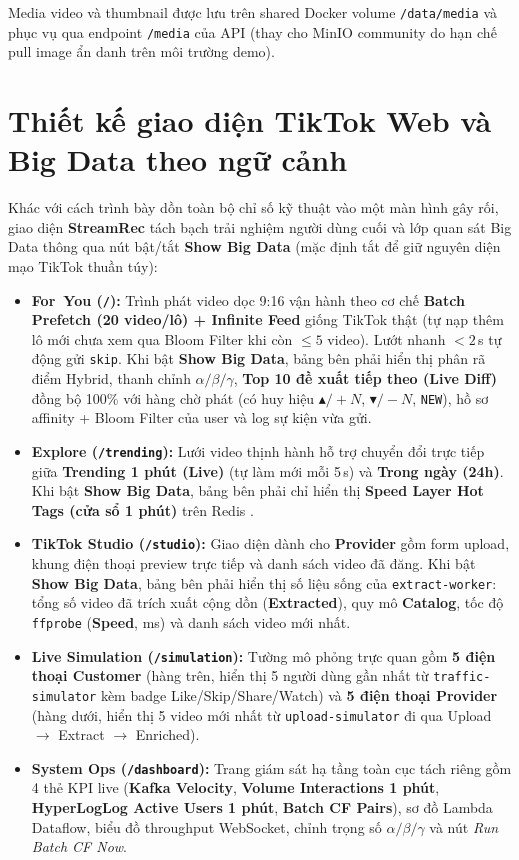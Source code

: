 Media video và thumbnail được lưu trên shared Docker volume \texttt{/data/media} và phục vụ qua endpoint \texttt{/media} của API (thay cho MinIO community do hạn chế pull image ẩn danh trên môi trường demo).

\section{Thiết kế giao diện TikTok Web và Big Data theo ngữ cảnh}

Khác với cách trình bày dồn toàn bộ chỉ số kỹ thuật vào một màn hình gây rối, giao diện \textbf{StreamRec} tách bạch trải nghiệm người dùng cuối và lớp quan sát Big Data thông qua nút bật/tắt \textbf{Show Big Data} (mặc định tắt để giữ nguyên diện mạo TikTok thuần túy):

\begin{itemize}
  \item \textbf{For~You (\texttt{/}):} Trình phát video dọc 9:16 vận hành theo cơ chế \textbf{Batch Prefetch (20 video/lô) + Infinite Feed} giống TikTok thật (tự nạp thêm lô mới chưa xem qua Bloom Filter khi còn $\le 5$ video). Lướt nhanh $<2$\,s tự động gửi \texttt{skip}. Khi bật \textbf{Show Big Data}, bảng bên phải hiển thị phân rã điểm Hybrid, thanh chỉnh $\alpha/\beta/\gamma$, \textbf{Top 10 đề xuất tiếp theo (Live Diff)} đồng bộ 100\% với hàng chờ phát (có huy hiệu $\blacktriangle/+N$, $\blacktriangledown/-N$, \texttt{NEW}), hồ sơ affinity + Bloom Filter của user và log sự kiện vừa gửi.
  \item \textbf{Explore (\texttt{/trending}):} Lưới video thịnh hành hỗ trợ chuyển đổi trực tiếp giữa \textbf{Trending 1 phút (Live)} (tự làm mới mỗi 5\,s) và \textbf{Trong ngày (24h)}. Khi bật \textbf{Show Big Data}, bảng bên phải chỉ hiển thị \textbf{Speed Layer Hot Tags (cửa sổ 1 phút)} trên Redis .
  \item \textbf{TikTok Studio (\texttt{/studio}):} Giao diện dành cho \textbf{Provider} gồm form upload, khung điện thoại preview trực tiếp và danh sách video đã đăng. Khi bật \textbf{Show Big Data}, bảng bên phải hiển thị số liệu sống của \texttt{extract-worker}: tổng số video đã trích xuất cộng dồn (\textbf{Extracted}), quy mô \textbf{Catalog}, tốc độ \texttt{ffprobe} (\textbf{Speed}, ms) và danh sách video mới nhất.
  \item \textbf{Live Simulation (\texttt{/simulation}):} Tường mô phỏng trực quan gồm \textbf{5 điện thoại Customer} (hàng trên, hiển thị 5 người dùng gần nhất từ \texttt{traffic-simulator} kèm badge Like/Skip/Share/Watch) và \textbf{5 điện thoại Provider} (hàng dưới, hiển thị 5 video mới nhất từ \texttt{upload-simulator} đi qua Upload $\rightarrow$ Extract $\rightarrow$ Enriched).
  \item \textbf{System Ops (\texttt{/dashboard}):} Trang giám sát hạ tầng toàn cục tách riêng gồm 4 thẻ KPI live (\textbf{Kafka Velocity}, \textbf{Volume Interactions 1 phút}, \textbf{HyperLogLog Active Users 1 phút}, \textbf{Batch CF Pairs}), sơ đồ Lambda Dataflow, biểu đồ throughput WebSocket, chỉnh trọng số $\alpha/\beta/\gamma$ và nút \textit{Run Batch CF Now}.
\end{itemize}

